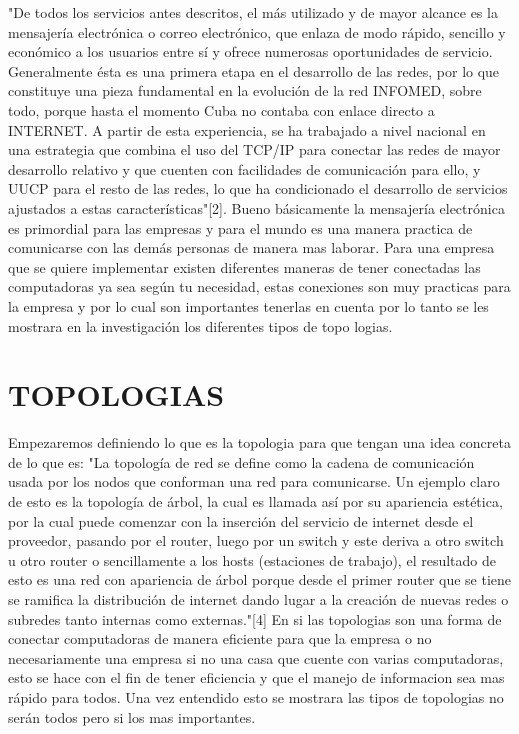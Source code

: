 \documentclass{bmcart}
\begin{document}
"De todos los servicios antes descritos, el más utilizado y de mayor alcance es la mensajería electrónica o correo electrónico, que enlaza de modo rápido, sencillo y económico a los usuarios entre sí y ofrece numerosas oportunidades de servicio. Generalmente ésta es una primera etapa en el desarrollo de las redes, por lo que constituye una pieza fundamental en la evolución de la red INFOMED, sobre todo, porque hasta el momento Cuba no contaba con enlace directo a INTERNET.
A partir de esta experiencia, se ha trabajado a nivel nacional en una estrategia que combina el uso del TCP/IP para conectar las redes de mayor desarrollo relativo y que cuenten con facilidades de comunicación para ello, y UUCP para el resto de las redes, lo que ha condicionado el desarrollo de servicios ajustados a estas características"[2]. Bueno básicamente la mensajería electrónica es primordial para las empresas y para el mundo es una manera practica de comunicarse con las demás personas de manera mas laborar. Para una empresa que se quiere implementar existen diferentes maneras de tener conectadas las computadoras ya sea según tu necesidad, estas conexiones son muy practicas para la empresa y por lo cual son importantes tenerlas en cuenta por lo tanto se les mostrara en la investigación los diferentes tipos de topo logias.
\section*{TOPOLOGIAS}
Empezaremos definiendo lo que es la topologia para que tengan una idea concreta de lo que es: "La topología de red se define como la cadena de comunicación usada por los nodos que
conforman una red para comunicarse. Un ejemplo claro de esto es la topología de árbol, la cual es
llamada así por su apariencia estética, por la cual puede comenzar con la inserción del servicio de
internet desde el proveedor, pasando por el router, luego por un switch y este deriva a otro switch
u otro router o sencillamente a los hosts (estaciones de trabajo), el resultado de esto es una red
con apariencia de árbol porque desde el primer router que se tiene se ramifica la distribución de
internet dando lugar a la creación de nuevas redes o subredes tanto internas como externas."[4]
En si las topologias son una forma de conectar computadoras de manera eficiente para que la empresa o no necesariamente una empresa si no una casa que cuente con varias computadoras, esto se hace con el fin de tener eficiencia y que el manejo de informacion sea mas rápido para todos. Una vez entendido esto se mostrara las tipos de topologias no serán todos pero si los mas importantes.
\end{document}
